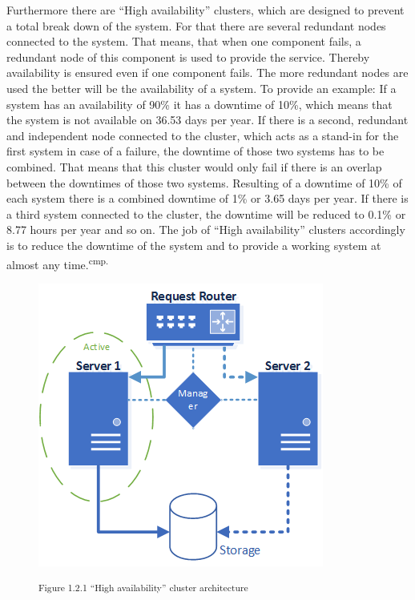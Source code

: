 
Furthermore there are ``High availability'' clusters, which are designed to prevent a total break down of the system. For that there are several redundant nodes connected to the system. That means, that when one component fails, a redundant node of this component is used to provide the service. Thereby availability is ensured even if one component fails. The more redundant nodes are used the better will be the availability of a system. To provide an example: If a system has an availability of 90\% it has a downtime of 10\%, which means that the system is not available on 36.53 days per year. If there is a second, redundant and independent node connected to the cluster, which acts as a stand-in for the first system in case of a failure, the downtime of those two systems has to be combined. That means that this cluster would only fail if there is an overlap between the downtimes of those two systems. Resulting of a downtime of 10\% of each system there is a combined downtime of 1\% or 3.65 days per year. If there is a third system connected to the cluster, the downtime will be reduced to 0.1\% or 8.77 hours per year and so on. The job of ``High availability'' clusters accordingly is to reduce the downtime of the system and to provide a working system at almost any time.\textsuperscript{cmp.\cite{9}}


\begin{figure}[h]
\centering
\includegraphics[width=\textwidth/25*10]{images/ha_cluster_architecture.png}

\textsuperscript{Figure 1.2.1 ``High availability'' cluster architecture}
\end{figure}

